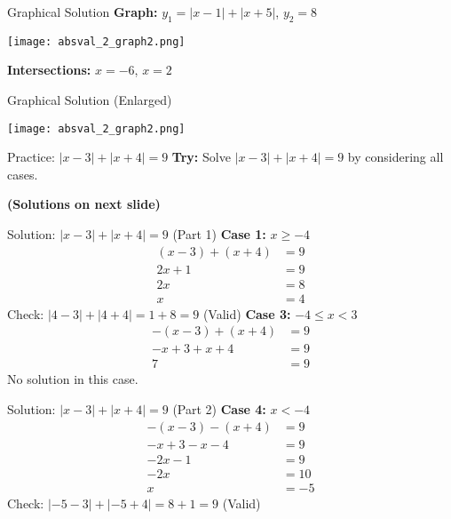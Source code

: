 \documentclass[aspectratio=169]{beamer}
\begin{document}
\begin{frame}{Graphical Solution}
    \footnotesize
    \textbf{Graph:} $y_1 = |x-1| + |x+5|$, $y_2 = 8$
    \begin{center}
        \texttt{[image: absval\_2\_graph2.png]}
    \end{center}
    \textbf{Intersections:} $x = -6$, $x = 2$
\end{frame}

\begin{frame}{Graphical Solution (Enlarged)}
    \begin{center}
        \texttt{[image: absval\_2\_graph2.png]}
    \end{center}
\end{frame}

\begin{frame}{Practice: $|x-3| + |x+4| = 9$}
    \footnotesize
    \textbf{Try:} Solve $|x-3| + |x+4| = 9$ by considering all cases.\par
    \textbf{(Solutions on next slide)}
\end{frame}

\begin{frame}{Solution: $|x-3| + |x+4| = 9$ (Part 1)}
    \footnotesize
    \textbf{Case 1:} $x \geq -4$
    \begin{align*}
        (x-3) + (x+4) &= 9 \\
        2x + 1 &= 9 \\
        2x &= 8 \\
        x &= 4
    \end{align*}
    Check: $|4-3| + |4+4| = 1 + 8 = 9$ (Valid)
    \vspace{1em}
    \textbf{Case 3:} $-4 \leq x < 3$
    \begin{align*}
        -(x-3) + (x+4) &= 9 \\
        -x+3+x+4 &= 9 \\
        7 &= 9
    \end{align*}
    No solution in this case.
\end{frame}

\begin{frame}{Solution: $|x-3| + |x+4| = 9$ (Part 2)}
    \footnotesize
    \textbf{Case 4:} $x < -4$
    \begin{align*}
        -(x-3) - (x+4) &= 9 \\
        -x+3-x-4 &= 9 \\
        -2x-1 &= 9 \\
        -2x &= 10 \\
        x &= -5
    \end{align*}
    Check: $|-5-3| + |-5+4| = 8 + 1 = 9$ (Valid)
\end{frame}
\end{document}
